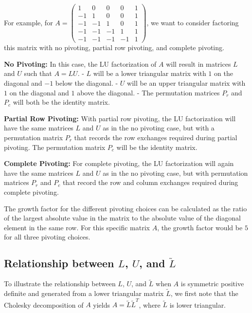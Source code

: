 \documentclass{article}
\begin{document}
For example, for \( A = \begin{pmatrix} 1 & 0 & 0 & 0 & 1 \\ -1 & 1 & 0 & 0 & 1 \\ -1 & -1 & 1 & 0 & 1 \\ -1 & -1 & -1 & 1 & 1 \\ -1 & -1 & -1 & -1 & 1 \end{pmatrix} \), we want to consider factoring this matrix with no pivoting, partial row pivoting, and complete pivoting.

\textbf{No Pivoting:}
In this case, the LU factorization of \( A \) will result in matrices \( L \) and \( U \) such that \( A = LU \).
- \( L \) will be a lower triangular matrix with \( 1 \) on the diagonal and \( -1 \) below the diagonal.
- \( U \) will be an upper triangular matrix with \( 1 \) on the diagonal and \( 1 \) above the diagonal.
- The permutation matrices \( P_r \) and \( P_c \) will both be the identity matrix.

\textbf{Partial Row Pivoting:}
With partial row pivoting, the LU factorization will have the same matrices \( L \) and \( U \) as in the no pivoting case, but with a permutation matrix \( P_r \) that records the row exchanges required during partial pivoting. The permutation matrix \( P_c \) will be the identity matrix.

\textbf{Complete Pivoting:}
For complete pivoting, the LU factorization will again have the same matrices \( L \) and \( U \) as in the no pivoting case, but with permutation matrices \( P_r \) and \( P_c \) that record the row and column exchanges required during complete pivoting.

The growth factor for the different pivoting choices can be calculated as the ratio of the largest absolute value in the matrix to the absolute value of the diagonal element in the same row. For this specific matrix \( A \), the growth factor would be \( 5 \) for all three pivoting choices.

\subsection{Relationship between \( L \), \( U \), and \( \tilde{L} \)}
To illustrate the relationship between \( L \), \( U \), and \( \tilde{L} \) when \( A \) is symmetric positive definite and generated from a lower triangular matrix \( \tilde{L} \), we first note that the Cholesky decomposition of \( A \) yields \( A = \tilde{L} \tilde{L}^T \), where \( \tilde{L} \) is lower triangular. 
\end{document}

